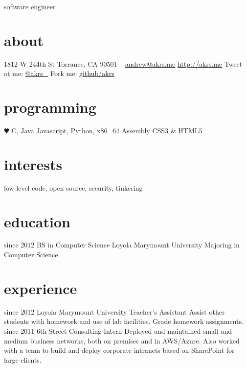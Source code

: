 \documentclass[]{akers-cv}
\begin{document}
       {software engineer}


\begin{aside}
  \section{about}
    1812 W 244th St
    Torrance, CA 90501
    ~
    \href{mailto:andrew@akrs.me}{andrew@akrs.me}
    \href{http://akrs.me}{http://akrs.me}
    Tweet at me: \href{http://twitter.com/akrs_}{@akrs\_}
    Fork me: \href{http://github.com/akrs}{github/akrs}
  \section{programming}
    {\color{red} $\varheartsuit$} C, Java
    Javascript, Python, x86\_64 Assembly
    CSS3 \& HTML5
\end{aside}

\section{interests}

low level code, open source, security, tinkering

\section{education}

\begin{entrylist}
  \entry
    {since 2012}
    {BS in Computer Science}
    {Loyola Marymount University}
    {Majoring in Computer Science}
\end{entrylist}

\section{experience}

\begin{entrylist}
  \entry
    {since 2012}
    {Loyola Marymount University}
    {Teacher's Assistant}
    {Assist other students with homework and use of lab facilities. Grade homework assignments.}
  \entry
    {since 2011}
    {6th Street Consulting}
    {Intern}
    {Deployed and maintained small and medium business networks, both on premises and in AWS/Azure. Also worked with a team to build and deploy corporate intranets based on SharePoint for large clients.}
\end{entrylist}
\end{document}
